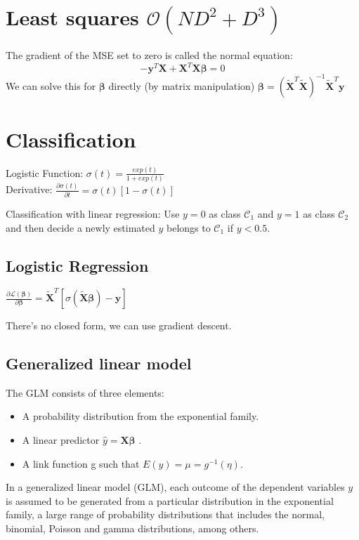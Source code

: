 \documentclass[10pt,a4paper,landscape]{article}
\renewcommand{\bf}[1]{\ensuremath{\mathbf{#1}}}
\newcommand{\bbeta}{\boldsymbol\beta}
\begin{document}
\begin{multicols*}{4}
\section{Least squares \small$\mathcal{O}(ND^2 + D^3)$}
The gradient of the MSE set to zero is called the normal equation:
$$ - \bf{y}^T \bf{X} + \bf{X}^T \bf{X} \bbeta = 0$$
We can solve this for $\bbeta$ directly (by matrix manipulation)
$\bbeta = ( \bf{\tilde{X}}^T \bf{\tilde{X}} )^{-1} \bf{\tilde{X}}^T \bf{y}$

\section{Classification}
Logistic Function: $\sigma(t) = \frac{exp(t)}{1+exp(t)}$\\
Derivative: $\frac{ \partial\sigma(t) }{ \partial t } = \sigma(t)[ 1 - \sigma(t) ]$

Classification with linear regression: Use $y = 0$ as class $\mathcal{C}_1$
and $y = 1$ as class $\mathcal{C}_2$ and then decide a newly estimated $y$ belongs
to $\mathcal{C}_1$ if $y < 0.5$.

\subsection{Logistic Regression}
$\frac{ \partial\mathcal{L}(\bbeta) }{ \partial \bbeta } = \tilde{\bf{X}}^T [\sigma(\tilde{\bf{X}} \bbeta) - \bf{y}]$

There's no closed form, we can use gradient descent.

\subsection{Generalized linear model}
The GLM consists of three elements:
\begin{itemize}
  \item A probability distribution from the exponential family.
  \item A linear predictor $\hat y = \bf{X} \bbeta$ .
  \item A link function g such that $E(y) = \mu = g^{-1}(\eta)$.
\end{itemize}

In a generalized linear model (GLM), each outcome of the dependent variables $y$ is assumed to be generated from a particular distribution in the exponential family, a large range of probability distributions that includes the normal, binomial, Poisson and gamma distributions, among others.



\end{multicols*}
\end{document}
